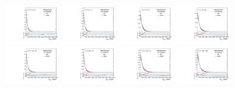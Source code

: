 \begin{figure}[htbp]
  \centering
  \includegraphics[width=0.21\textwidth]{fig/uncertainties/systs_nonRes_e_HP_bb_LDy_Diag_ProjX.pdf}
  \includegraphics[width=0.21\textwidth]{fig/uncertainties/systs_nonRes_e_LP_bb_LDy_Diag_ProjX.pdf}
  \includegraphics[width=0.21\textwidth]{fig/uncertainties/systs_nonRes_e_HP_bb_HDy_Diag_ProjX.pdf}
  \includegraphics[width=0.21\textwidth]{fig/uncertainties/systs_nonRes_e_LP_bb_HDy_Diag_ProjX.pdf}\\
  \includegraphics[width=0.21\textwidth]{fig/uncertainties/systs_nonRes_e_HP_nobb_LDy_Diag_ProjX.pdf}
  \includegraphics[width=0.21\textwidth]{fig/uncertainties/systs_nonRes_e_LP_nobb_LDy_Diag_ProjX.pdf}
  \includegraphics[width=0.21\textwidth]{fig/uncertainties/systs_nonRes_e_HP_nobb_HDy_Diag_ProjX.pdf}
  \includegraphics[width=0.21\textwidth]{fig/uncertainties/systs_nonRes_e_LP_nobb_HDy_Diag_ProjX.pdf}\\

\end{figure}
